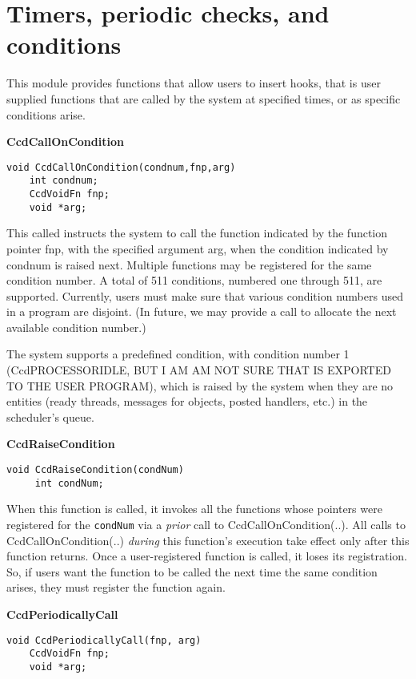 

\chapter{Timers, periodic checks, and conditions}

This module provides functions that allow users to insert hooks, that
is user supplied functions that are called by the system at specified
times, or as specific conditions arise.

{\bf  CcdCallOnCondition}
\begin{verbatim}
void CcdCallOnCondition(condnum,fnp,arg)
    int condnum;
    CcdVoidFn fnp;
    void *arg;      
\end{verbatim}

This called instructs the system to call the function indicated by the
function pointer fnp, with the specified argument arg, when the
condition indicated by condnum is raised next. Multiple functions may
be registered for the same condition number. A total of 511
conditions, numbered one through 511, are supported.  Currently, users
must make sure that various condition numbers used in a program are
disjoint.  (In future, we may provide a call to allocate the next
available condition number.)

The system supports a predefined condition, with condition number 1
(CcdPROCESSORIDLE, BUT I AM AM NOT SURE THAT IS EXPORTED TO THE USER
PROGRAM), which is raised by the system when they are no entities
(ready threads, messages for objects, posted handlers, etc.) in the
scheduler's queue.

\vspace*{0.2in}
{\bf  CcdRaiseCondition}
\begin{verbatim}
void CcdRaiseCondition(condNum)
     int condNum;
\end{verbatim}

When this function is called, it invokes all the functions whose
pointers were registered for the \verb#condNum# via a {\em prior} call
to CcdCallOnCondition(..).  All calls to CcdCallOnCondition(..) {\em
during} this function's execution take effect only after this function
returns.  Once a user-registered function is called, it loses its
registration.  So, if users want the function to be called the next
time the same condition arises, they must register the function again.

\vspace*{0.2in}
{\bf  CcdPeriodicallyCall}
\begin{verbatim}
void CcdPeriodicallyCall(fnp, arg)
    CcdVoidFn fnp;
    void *arg;  
\end{verbatim}

